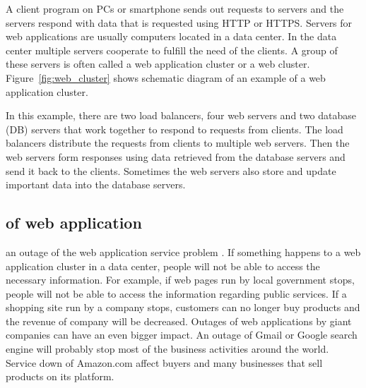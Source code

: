 A client program on PCs or smartphone sends out requests to servers\added{,} and the servers respond with data that is requested using HTTP or HTTPS. 
Servers for web applications are usually computers located in a data center.
In the data center multiple servers cooperate to fulfill the need of the clients.
A group of these servers is often called a web application cluster or a web cluster.
Figure~\ref{fig:web_cluster} shows schematic diagram of an example of a web application cluster.

In this example, there are two load balancers, four web servers and two database (DB) servers that work together to respond to  requests from  clients.
The load balancers distribute the requests from  clients to multiple web servers.
Then the web servers form responses using data retrieved from the database servers and send it back to the clients.
Sometimes the web servers also store and update important data into the database servers.

\subsection{ of web application}


  an outage of the web application service  problem \cite{}.
If something happens to a web application cluster in a data center, people will not be able to access the necessary information.
%
For example, if web pages run by local government stops, people will not be able to access the information regarding public services.
If a shopping site run by a company stops, customers can no longer buy products and the revenue of  company will be  decreased.
Outages of web applications by giant companies can have an even bigger impact.
An outage of Gmail or Google search engine will probably stop most of the business activities around the world.
Service down of Amazon.com affect buyers and many businesses that sell products on its platform.

